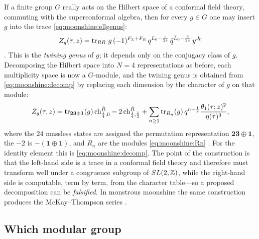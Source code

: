 If a finite group $G$ really acts on the Hilbert space of a conformal field theory,
commuting with the superconformal algebra, then for every $g\in G$ one may insert $g$ into
the trace \eqref{eq:moonshine:ellgenus}:
\begin{equation}\label{eq:moonshine:twining}
  Z_g(\tau,z)=\operatorname{tr}_{RR}\,g\,(-1)^{F_L+F_R}\,q^{L_0-\frac c{24}}\,\bar q^{\bar L_0-\frac{\bar c}{24}}\,
  y^{J_0}
\end{equation}
. This is the \emph{twining genus}
of $g$; it depends only on the conjugacy class of $g$. Decomposing the Hilbert space into
$N=4$ representations as before, each multiplicity space is now a $G$-module, and the
twining genus is obtained from \eqref{eq:moonshine:decomp} by replacing each dimension by
the character of $g$ on that module:
\begin{equation}\label{eq:moonshine:twiningdecomp}
  Z_g(\tau,z)=\operatorname{tr}_{\mathbf{23}\oplus\mathbf 1}(g)\,\mathrm{ch}^{\hat R}_{\frac14,0}
  -2\,\mathrm{ch}^{\hat R}_{\frac14,\frac12}
  +\sum_{n\ge1}\operatorname{tr}_{R_n}(g)\,q^{n-\frac18}\frac{\theta_1(\tau;z)^2}{\eta(\tau)^3},
\end{equation}
where the $24$ massless states are assigned the permutation representation
$\mathbf{23}\oplus\mathbf 1$, the $-2$ is $-(\mathbf 1\oplus\mathbf 1)$, and $R_n$ are the
modules \eqref{eq:moonshine:Rn} . For the identity element
this is \eqref{eq:moonshine:decomp}. The point of the construction is that the left-hand
side is a trace in a conformal field theory and therefore must transform well under a
congruence subgroup of $SL(2,\mathbb{Z})$, while the right-hand side is computable, term by term, from
the character table---so a proposed decomposition can be \emph{falsified}. In monstrous
moonshine the same construction produces the McKay--Thompson series
.

\subsection{Which modular group}

